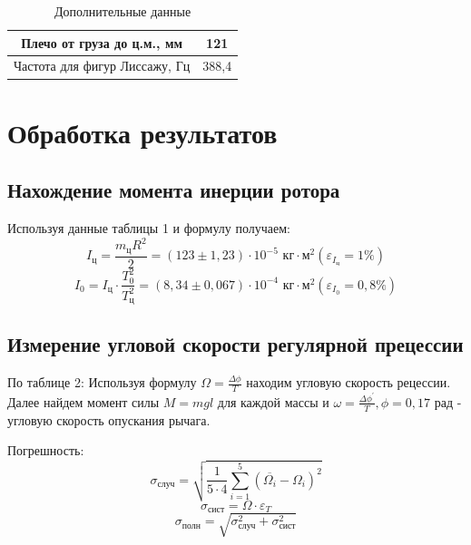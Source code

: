 \documentclass[a4paper]{article}
\begin{document}
\begin{table}[!h]
\begin{center}
\begin{tabular}{|c|c|}
\hline
Плечо от груза до ц.м., мм    & 121   \\ \hline
Частота для фигур Лиссажу, Гц & 388,4 \\ \hline
\end{tabular}
\caption{Дополнительные данные}
\end{center}
\end{table}

\section{Обработка результатов}

\subsection{Нахождение момента инерции ротора}

Используя данные таблицы 1 и формулу \label{moment} получаем:
\[I_{\text{ц}} = \frac{m_{\text{ц}}R^2}{2} = (123 \pm 1,23) \cdot 10^{-5} \text{ кг}\cdot\text{м}^2 (\varepsilon_{I_{\text{ц}}} = 1\%)\]
\[I_{0} = I_{\text{ц}} \cdot \frac{T_{0}^2}{T_{\text{ц}}^2} = (8,34 \pm 0,067) \cdot 10^{-4} \text{ кг}\cdot\text{м}^2 (\varepsilon_{I_{0}} = 0,8\%)\]

\subsection{Измерение угловой скорости регулярной прецессии}

По таблице 2:
Используя формулу $\Omega = \frac{\Delta\phi}{T}$ находим угловую скорость рецессии. Далее найдем момент силы $M = mgl$ для каждой массы и $\omega = \frac{\Delta\phi^{'}}{T}, \phi = 0,17 \text{ рад}$ - угловую скорость опускания рычага.

Погрешность:
\[\sigma_{\text{случ}} = \sqrt{\frac{1}{5 \cdot 4}\sum\limits_{i=1}^{5} (\overline{\Omega_{i}} - \Omega_{i})^2}\]
\[\sigma_{\text{сист}} = \Omega \cdot \varepsilon_{T}\]
\[\sigma_{\text{полн}} = \sqrt{\sigma_{\text{случ}}^2 + \sigma_{\text{сист}}^2}\]
\end{document}
